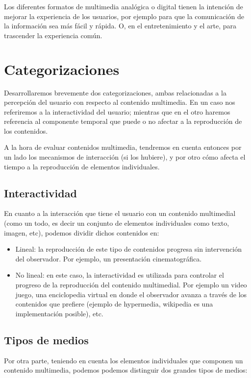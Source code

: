 \documentclass[12pt]{article}
\begin{document}
Los diferentes formatos de multimedia analógica o digital tienen la 
intención de mejorar la experiencia de los usuarios, por ejemplo para 
que la comunicación de la información sea más fácil y rápida. O, en 
el entretenimiento y el arte, para trascender la experiencia común.\cite{wikipmmes} 


\section*{Categorizaciones}

Desarrollaremos brevemente dos categorizaciones, ambas relacionadas a la 
percepción del usuario con respecto al contenido multimedia. En un caso 
nos referiremos a la interactividad del usuario; mientras que en el otro 
haremos referencia al componente temporal que puede o no afectar a la
reproducción de los contenidos. 

A la hora de evaluar contenidos multimedia, tendremos en cuenta entonces
por un lado los mecanismos de interacción (si los hubiere), y por otro 
cómo afecta el tiempo a la reproducción de elementos individuales. 

\subsection*{Interactividad}
En cuanto a la interacción que tiene el usuario con un contenido 
multimedial (como un todo, es decir un conjunto de elementos individuales
como texto, imagen, etc), podemos dividir dichos contenidos en: 
\begin{itemize}
\item Lineal: la reproducción de este tipo de contenidos progresa 
sin intervención del observador. Por ejemplo, un presentación cinematográfica.  
\item No lineal: en este caso, la interactividad es utilizada para 
controlar el progreso de la reproducción del contenido multimedial. Por 
ejemplo un video juego, una enciclopedia virtual en donde el observador
avanza a través de los contenidos que prefiere (ejemplo de hypermedia, 
wikipedia es una implementación posible), etc. 
\end{itemize}

\subsection*{Tipos de medios}
Por otra parte, teniendo en cuenta los elementos individuales que componen un 
contenido multimedia, podemos podemos distinguir dos grandes tipos de medios: 
\end{document}
